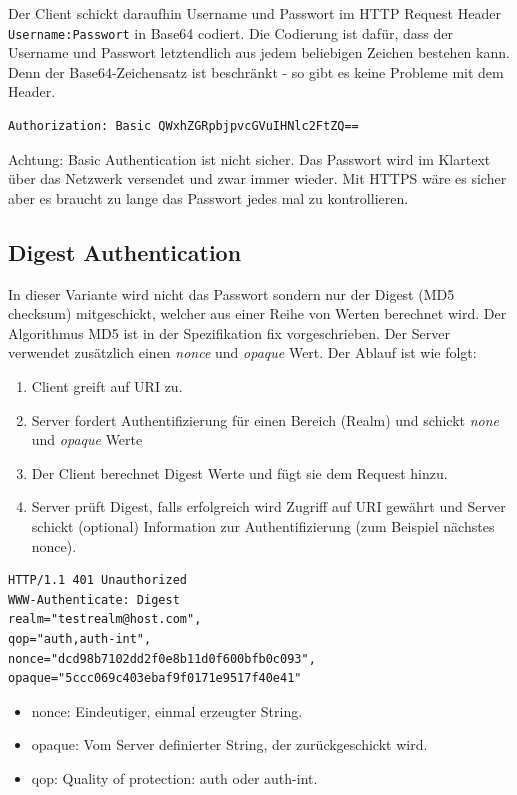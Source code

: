 Der Client schickt daraufhin Username und Passwort im HTTP Request Header \verb|Username:Passwort| in Base64 codiert. Die Codierung ist dafür, dass der Username und Passwort letztendlich aus jedem beliebigen Zeichen bestehen kann. Denn der Base64-Zeichensatz ist beschränkt - so gibt es keine Probleme mit dem Header.

\begin{lstlisting}[caption=HTTP Request Header]
Authorization: Basic QWxhZGRpbjpvcGVuIHNlc2FtZQ==
\end{lstlisting}

Achtung: Basic Authentication ist nicht sicher. Das Passwort wird im Klartext über das Netzwerk versendet und zwar immer wieder. Mit HTTPS wäre es sicher aber es braucht zu lange das Passwort jedes mal zu kontrollieren.

\subsection{Digest Authentication}

In dieser Variante wird nicht das Passwort sondern nur der Digest (MD5 checksum) mitgeschickt, welcher aus einer Reihe von Werten berechnet wird. Der Algorithmus MD5 ist in der Spezifikation fix vorgeschrieben. Der Server verwendet zusätzlich einen \textit{nonce} und \textit{opaque} Wert. Der Ablauf ist wie folgt:

\begin{enumerate}
	\item Client greift auf URI zu.
	\item Server fordert Authentifizierung für einen Bereich (Realm) und schickt \textit{none} und \textit{opaque} Werte
	\item Der Client berechnet Digest Werte und fügt sie dem Request hinzu.
	\item Server prüft Digest, falls erfolgreich wird Zugriff auf
	URI gewährt und Server schickt (optional) Information
	zur Authentifizierung (zum Beispiel nächstes nonce).
\end{enumerate}

\begin{lstlisting}[caption=HTTP Response Header]
HTTP/1.1 401 Unauthorized
WWW-Authenticate: Digest
realm="testrealm@host.com",
qop="auth,auth-int",
nonce="dcd98b7102dd2f0e8b11d0f600bfb0c093",
opaque="5ccc069c403ebaf9f0171e9517f40e41"
\end{lstlisting}

\begin{itemize}
	\item nonce: Eindeutiger, einmal erzeugter String.
	\item opaque: Vom Server definierter String, der zurückgeschickt wird.
	\item qop: Quality of protection: auth oder auth-int.
\end{itemize}

